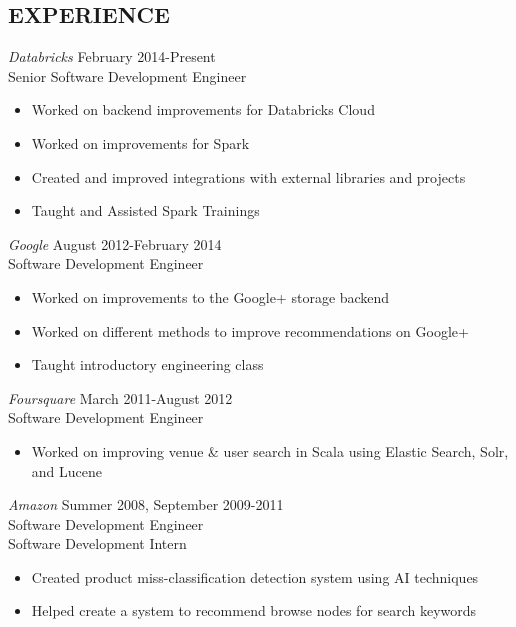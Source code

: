 \documentclass[10pt,line,margin=0.1]{newsres}
\begin{document}
\begin{resume}
\section{EXPERIENCE}
        {\sl Databricks} \hfill February 2014-Present\\
        Senior Software Development Engineer
        \begin{itemize}  \itemsep -2pt %
          \item Worked on backend improvements for Databricks Cloud
          \item Worked on improvements for Spark
          \item Created and improved integrations with external libraries and projects
          \item Taught and Assisted Spark Trainings
        \end{itemize}
        {\sl Google} \hfill August 2012-February 2014\\
        Software Development Engineer
        \begin{itemize}  \itemsep -2pt %
          \item Worked on improvements to the Google+ storage backend
          \item Worked on different methods to improve recommendations on Google+
          \item Taught introductory engineering class
        \end{itemize}
        {\sl Foursquare} \hfill March 2011-August 2012\\
        Software Development Engineer
        \begin{itemize}  \itemsep -2pt %
        \item Worked on improving venue \& user search in Scala using Elastic Search, Solr, and Lucene
        \end{itemize}
        {\sl Amazon} \hfill            Summer 2008, September 2009-2011 \\
        Software Development Engineer \\
        Software Development Intern
        \begin{itemize}  \itemsep -2pt %
        \item Created product miss-classification detection system using AI techniques
        \item Helped create a system to recommend browse nodes for search keywords
        \end{itemize} 

\end{resume}
\end{document}

